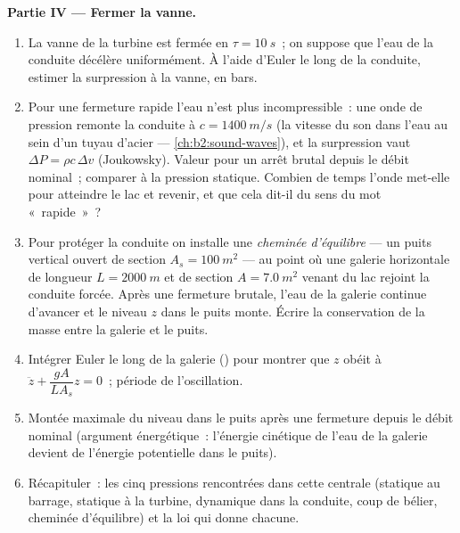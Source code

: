 \begin{problem}
\medskip
\noindent\textbf{Partie IV --- Fermer la vanne.}
\begin{enumerate}[resume]
  \item La vanne de la turbine est fermée en $\tau = \qty{10}{s}$~; on suppose que
        l'eau de la conduite décélère uniformément. À l'aide d'Euler le long
        de la conduite, estimer la surpression à la vanne, en bars.
  \item Pour une fermeture rapide l'eau n'est plus incompressible~: une onde de
        pression remonte la conduite à $c = \qty{1400}{m/s}$ (la vitesse du
        son dans l'eau au sein d'un tuyau d'acier --- \cref{ch:b2:sound-waves}),
        et la surpression vaut $\Delta P = \rho c\,\Delta v$ (Joukowsky).
        Valeur pour un arrêt brutal depuis le débit nominal~; comparer à la
        pression statique. Combien de temps l'onde met-elle pour atteindre le
        lac et revenir, et que cela dit-il du sens du mot
        «~rapide~»~?
  \item Pour protéger la conduite on installe une \emph{cheminée d'équilibre} --- un puits
        vertical ouvert de section $A_s = \qty{100}{m^2}$ --- au point où une
        galerie horizontale de longueur $L = \qty{2000}{m}$ et de section $A =
        \qty{7.0}{m^2}$ venant du lac rejoint la conduite forcée. Après une
        fermeture brutale, l'eau de la galerie continue d'avancer et le
        niveau $z$ dans le puits monte. Écrire la conservation de la masse entre
        la galerie et le puits.
  \item Intégrer Euler le long de la galerie () pour montrer que
        $z$ obéit à $\ddot z + \dfrac{gA}{LA_s}z = 0$~; période de
        l'oscillation.
  \item Montée maximale du niveau dans le puits après une fermeture depuis le
        débit nominal (argument énergétique~: l'énergie cinétique de l'eau de la galerie
        devient de l'énergie potentielle dans le puits).
  \item Récapituler~: les cinq pressions rencontrées dans cette centrale (statique au
        barrage, statique à la turbine, dynamique dans la conduite, coup de bélier,
        cheminée d'équilibre) et la loi qui donne chacune.
\end{enumerate}
\end{problem}
